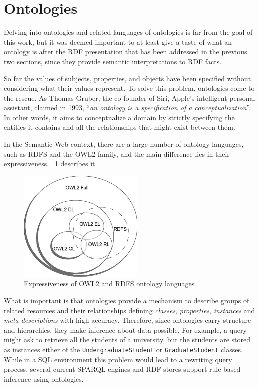 \documentclass[10pt, a4paper]{report}
\begin{document}
\section{Ontologies}

Delving into ontologies and related languages of ontologies is far from the goal of this work, but it was deemed important to at least give a taste of what an ontology is after the RDF presentation that has been addressed in the previous two sections, since they provide semantic interpretations to RDF facts.

So far the values of subjects, properties, and objects have been specified without considering what their values represent. To solve this problem, ontologies come to the rescue. As Thomas Gruber, the co-founder of Siri, Apple's intelligent personal assistant, claimed in 1993, ``\textit{an ontology is a specification of a conceptualization}''. In other words, it aims to conceptualize a domain by strictly specifying the entities it contains and all the relationships that might exist between them.

In the Semantic Web context, there are a large number of ontology languages, such as RDFS and the OWL2 family, and the main difference lies in their expressiveness. \figurename~\ref{fig:ontologies_languages} describes it.

\begin{figure}
	\centering
	\includegraphics[width=6cm]{./assets/img/ontologies_languages.jpg}
	\caption{Expressiveness of OWL2 and RDFS ontology languages}
	\label{fig:ontologies_languages}
	\vspace{0.5cm}
\end{figure}

What is important is that ontologies provide a mechanism to describe groups of related resources and their relationships defining \textit{classes}, \textit{properties}, \textit{instances} and \textit{meta-descriptions} with high accuracy. Therefore, since ontologies carry structure and hierarchies, they make inference about data possible. For example, a query might ask to retrieve all the students of a university, but the  students are stored as instances either of the \texttt{UndergraduateStudent} or \texttt{GraduateStudent} classes. While in a SQL environment this problem would lead to a rewriting query process, several current SPARQL engines and RDF stores support rule based inference using ontologies.
\end{document}
